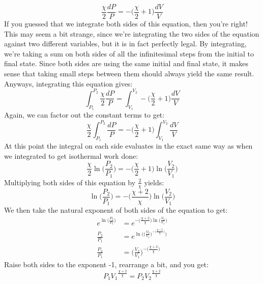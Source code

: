\begin{equation*}
    \frac{\chi}{2}\frac{dP}{P} = -\Big(\frac{\chi}{2} + 1\Big)\frac{dV}{V}
\end{equation*}
If you guessed that we integrate both sides of this equation, then you're right! This may seem a bit strange, since we're integrating the two sides of the equation against two different variables, but it is in fact perfectly legal. By integrating, we're taking a sum on both sides of all the infinitesimal steps from the initial to final state. Since both sides are using the same initial and final state, it makes sense that taking small steps between them should always yield the same result. Anyways, integrating this equation gives:
\begin{equation*}
    \int_{P_1}^{P_2} \frac{\chi}{2}\frac{dP}{P} = \int_{V_1}^{V_2} -\Big(\frac{\chi}{2} + 1\Big)\frac{dV}{V}
\end{equation*}
Again, we can factor out the constant terms to get:
\begin{equation*}
    \frac{\chi}{2}\int_{P_1}^{P_2} \frac{dP}{P} = -\Big(\frac{\chi}{2} + 1\Big)\int_{V_1}^{V_2} \frac{dV}{V}
\end{equation*}
At this point the integral on each side evaluates in the exact same way as when we integrated to get isothermal work done:
\begin{equation*}
    \frac{\chi}{2}\ln{\Big(\frac{P_2}{P_1}\Big)} = -\Big(\frac{\chi}{2} + 1\Big)\ln{\Big(\frac{V_2}{V_1}\Big)}
\end{equation*}
Multiplying both sides of this equation by $\frac{2}{\chi}$ yields:
\begin{equation*}
    \ln{\Big(\frac{P_2}{P_1}\Big)} = -\Big(\frac{\chi+2}{\chi}\Big)\ln{\Big(\frac{V_2}{V_1}\Big)}
\end{equation*}
We then take the natural exponent of both sides of the equation to get:
\begin{align*}
    e^{\ln{\big(\frac{P_2}{P_1}\big)}} &= e^{-\big(\frac{\chi+2}{\chi}\big)\ln{\big(\frac{V_2}{V_1}\big)}} \\
    \frac{P_2}{P_1} &= e^{\ln{\Big(\big(\frac{V_2}{V_1}\big)^{-\big(\frac{\chi+2}{\chi}\big)}\Big)}} \\
    \frac{P_2}{P_1} &= \Big(\frac{V_2}{V_1}\Big)^{-\big(\frac{\chi+2}{\chi}\big)}
\end{align*}
Raise both sides to the exponent -1, rearrange a bit, and you get:
\begin{equation}
    {P_1}{V_1}^{\frac{\chi+2}{\chi}} = {P_2}{V_2}^{\frac{\chi+2}{\chi}}
\end{equation}
